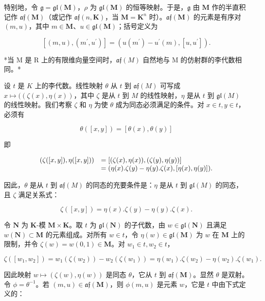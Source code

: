 特别地，令 \(\mathfrak{g} = \mathfrak{gl}(\mathbf{M})\)，\(\rho\) 为 \(\mathfrak{gl}(\mathbf{M})\) 的恒等映射。于是，\(\mathfrak{g}\) 由 \(\mathbf{M}\) 作的半直积记作 \(\mathfrak{af}(\mathbf{M})\)（或记作 \(\mathfrak{af}(n,\mathbf{K})\)，当 \(\mathbf{M} = \mathbf{K}^{n}\) 时）。\(\mathfrak{af}(\mathbf{M})\) 的元素是有序对 \((m,u)\)，其中 \(m\in \mathbf{M}\)、\(u\in \mathfrak{gl}(\mathbf{M})\)；括号定义为

\[
[ (m, u), (m ^ {\prime}, u ^ {\prime}) ] = (u (m ^ {\prime}) - u ^ {\prime} (m), [ u, u ^ {\prime} ]).
\]

*当 M 是 R 上的有限维向量空间时，\(\mathfrak{af}(M)\) 自然地与 M 的仿射群的李代数相同。*

设 \(t\) 是 \(K\) 上的李代数。线性映射 \(\theta\) 从 \(t\) 到 \(\mathfrak{af}(M)\) 可写成 \(x \mapsto ((\zeta(x), \eta(x))\)，其中 \(\zeta\) 是从 \(t\) 到 \(M\) 的线性映射，\(\eta\) 是从 \(t\) 到 \(\mathfrak{gl}(M)\) 的线性映射。我们考察 \(\zeta\) 和 \(\eta\) 为使 \(\theta\) 成为同态必须满足的条件。对 \(x \in t, y \in t\)，必须有

\[
\theta ([ x, y ]) = [ \theta (x), \theta (y) ]
\]

即

\[
\begin{array}{r l} (\zeta ([ x, y ]), \eta ([ x, y ])) & = [ (\zeta (x), \eta (x)), (\zeta (y), \eta (y)) ] \\ & = (\eta (x). \zeta (y) - \eta (y). \zeta (x), [ \eta (x), \eta (y) ]). \end{array}
\]

因此，\(\theta\) 是从 \(t\) 到 \(\mathfrak{af}(M)\) 的同态的充要条件是：\(\eta\) 是从 \(t\) 到 \(\mathfrak{gl}(M)\) 的同态，且 \(\zeta\) 满足关系式：

\[
\zeta ([ x, y ]) = \eta (x). \zeta (y) - \eta (y). \zeta (x).\tag{13}
\]

令 \(\mathbf{N}\) 为 \(\mathbf{K}\)-模 \(\mathbf{M} \times \mathbf{K}\)。取 \(t\) 为 \(\mathfrak{gl}(\mathbf{N})\) 的子代数，由 \(w \in \mathfrak{gl}(\mathbf{N})\) 且满足 \(w(\mathbf{N}) \subset \mathbf{M}\) 的元素组成。对所有 \(w \in t\)，令 \(\eta(w) \in \mathfrak{gl}(\mathbf{M})\) 为 \(w\) 在 \(\mathbf{M}\) 上的限制，并令 \(\zeta(w) = w(0,1) \in \mathbf{M}\)。对 \(w_1 \in t, w_2 \in t\)，

\[
\zeta ([ w _ {1}, w _ {2} ]) = w _ {1} (\zeta (w _ {2})) - w _ {2} (\zeta (w _ {1})) = \eta (w _ {1}). \zeta (w _ {2}) - \eta (w _ {2}). \zeta (w _ {1}).
\]

因此映射 \(w \mapsto (\zeta(w), \eta(w))\) 是同态 \(\theta\)，它从 \(t\) 到 \(\mathfrak{af}(\mathbf{M})\)。显然 \(\theta\) 是双射。令 \(\phi = \theta^{-1}\)。若 \((m, u) \in \mathfrak{af}(\mathbf{M})\)，则 \(\phi(m, u)\) 是元素 \(w\)，它是 \(t\) 中由下式定义的：

